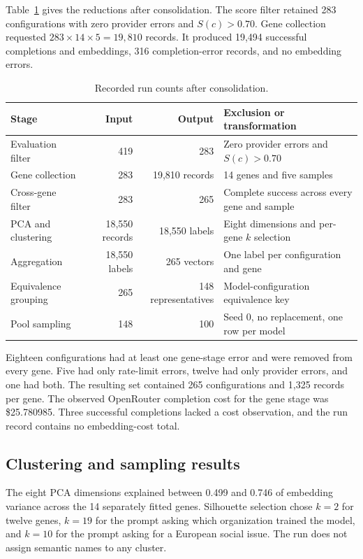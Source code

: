 \documentclass[11pt]{article}
\begin{document}
Table~\ref{tab:run} gives the reductions after consolidation.  The score filter retained 283 configurations with zero provider errors and $S(c)>0.70$.  Gene collection requested $283\times14\times5=19{,}810$ records.  It produced 19,494 successful completions and embeddings, 316 completion-error records, and no embedding errors.

\begin{table}[htbp]
\centering
\small
\caption{Recorded run counts after consolidation.}
\label{tab:run}
\begin{tabularx}{\textwidth}{@{}lrrX@{}}
\toprule
Stage & Input & Output & Exclusion or transformation \\
\midrule
Evaluation filter & 419 & 283 & Zero provider errors and $S(c)>0.70$ \\
Gene collection & 283 & 19,810 records & 14 genes and five samples \\
Cross-gene filter & 283 & 265 & Complete success across every gene and sample \\
PCA and clustering & 18,550 records & 18,550 labels & Eight dimensions and per-gene $k$ selection \\
Aggregation & 18,550 labels & 265 vectors & One label per configuration and gene \\
Equivalence grouping & 265 & 148 representatives & Model-configuration equivalence key \\
Pool sampling & 148 & 100 & Seed 0, no replacement, one row per model \\
\bottomrule
\end{tabularx}
\end{table}

Eighteen configurations had at least one gene-stage error and were removed from every gene.  Five had only rate-limit errors, twelve had only provider errors, and one had both.  The resulting set contained 265 configurations and 1,325 records per gene.  The observed OpenRouter completion cost for the gene stage was \$25.780985.  Three successful completions lacked a cost observation, and the run record contains no embedding-cost total.

\subsection{Clustering and sampling results}

The eight PCA dimensions explained between 0.499 and 0.746 of embedding variance across the 14 separately fitted genes.  Silhouette selection chose $k=2$ for twelve genes, $k=19$ for the prompt asking which organization trained the model, and $k=10$ for the prompt asking for a European social issue.  The run does not assign semantic names to any cluster.
\end{document}
